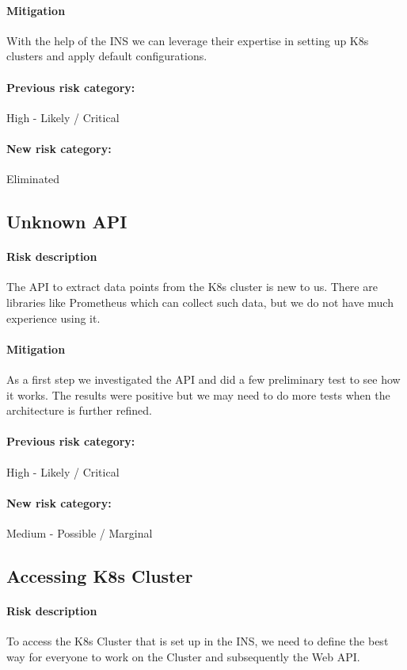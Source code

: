\paragraph{Mitigation} With the help of the INS we can leverage their expertise in setting up K8s clusters and apply default configurations.
\paragraph{Previous risk category:} High - Likely / Critical
\paragraph{New risk category:} Eliminated

\subsection{Unknown API}
\paragraph{Risk description} The API to extract data points from the K8s cluster is new to us. There are libraries like Prometheus which can collect such data, but we do not have much experience using it.
\paragraph{Mitigation} As a first step we investigated the API and did a few preliminary test to see how it works. The results were positive but we may need to do more tests when the architecture is further refined.
\paragraph{Previous risk category:} High - Likely / Critical
\paragraph{New risk category:} Medium - Possible / Marginal

\subsection{Accessing K8s Cluster}
\paragraph{Risk description} To access the K8s Cluster that is set up in the INS, we need to define the best way for everyone to work on the Cluster and subsequently the Web API.
